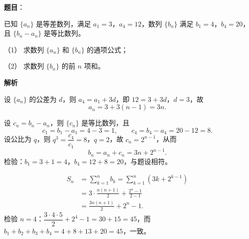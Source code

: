 \begin{answer}

\textbf{题目}：

已知 $\{a_n\}$ 是等差数列，满足 $a_1=3$，$a_4=12$，数列 $\{b_n\}$ 满足 $b_1=4$，$b_4=20$，且 $\{b_n-a_n\}$ 是等比数列。

（1） 求数列 $\{a_n\}$ 和 $\{b_n\}$ 的通项公式；

（2） 求数列 $\{b_n\}$ 的前 $n$ 项和。

\textbf{解析}


设 $\{a_n\}$ 的公差为 $d$，则 $a_4=a_1+3d$，即 $12=3+3d$，$d=3$，故
\nopagebreak[4]
\[a_n=3+3(n-1)=3n .\]

设 $c_n=b_n-a_n$，则 $\{c_n\}$ 是等比数列，且
\nopagebreak[4]
\[c_1=b_1-a_1=4-3=1,\qquad c_4=b_4-a_4=20-12=8 .\]
设公比为 $q$，则 $q^3=\dfrac{c_4}{c_1}=8$，$q=2$，故 $c_n=2^{n-1}$，从而
\nopagebreak[4]
\[b_n=a_n+c_n=3n+2^{n-1} .\]
检验：$b_1=3+1=4$，$b_4=12+8=20$，与题设相符。


\nopagebreak[4]
\[\begin{aligned}
S_n&=\sum_{k=1}^{n}b_k=\sum_{k=1}^{n}\left(3k+2^{k-1}\right)\\
&=3\cdot\frac{n(n+1)}2+\frac{2^n-1}{2-1}\\
&=\frac{3n(n+1)}2+2^n-1 .
\end{aligned}\]
检验 $n=4$：$\dfrac{3\cdot4\cdot5}2+2^4-1=30+15=45$，而 $b_1+b_2+b_3+b_4=4+8+13+20=45$，一致。



\end{answer}
